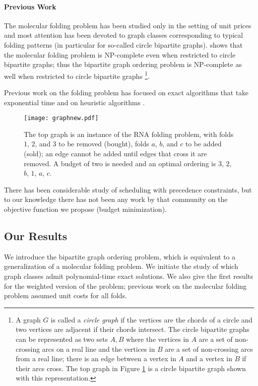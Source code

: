 \documentclass[letterpaper,11pt,abstracton]{scrartcl}
\begin{document}
\paragraph{Previous Work}
The molecular folding problem has been studied only in the
setting of unit prices and most attention has been devoted to graph classes corresponding to typical
folding patterns (in particular for so-called circle bipartite graphs).
\cite{MTSC09} shows that the molecular folding problem is NP-complete
even when restricted to circle bipartite graphs; thus the bipartite graph ordering
problem is NP-complete as well when restricted to circle bipartite graphs
\footnote{ A graph $G$ is called a \emph{circle graph} if the vertices
  are the chords of a circle and two vertices are adjacent if their
  chords intersect.  The circle bipartite graphs can be represented as two
  sets $A,B$ where the vertices in $A$ are a set of non-crossing arcs
  on a real line and the vertices in $B$ are a set of non-crossing
  arcs from a real line; there is an edge between a vertex in $A$ and
  a vertex in $B$ if their arcs cross.  The top graph in Figure
  \ref{fig:1} is a circle bipartite graph shown with this representation.}.

Previous work on the folding problem has focused on exact algorithms that
take exponential time and on heuristic algorithms \cite{FHMS01}.

\begin{figure}[htbp]
\begin{center}
\texttt{[image: graphnew.pdf]}
\caption{
\footnotesize{
  The top graph is an instance of the RNA folding problem, with folds $1$, $2$,
  and $3$ to be removed (bought), folds $a$, $b$, and $c$ to be added (sold); an edge cannot
  be added until edges that cross it are removed. A budget of two is needed and an optimal ordering is $3$, $2$, $b$, $1$, $a$, $c$.
}
}
\label{fig:1}
\end{center}
\end{figure}




There has been considerable study of scheduling with precedence constraints,
but to our knowledge there has not been any work by that community on the
objective function we propose (budget minimization).

\subsection{Our Results}

We introduce the bipartite graph ordering problem, which is equivalent to a
generalization of a molecular folding problem.  We initiate the study
of which graph classes admit polynomial-time exact solutions. We also
give the first results for the weighted version of the problem; previous
work on the molecular folding problem assumed unit costs for all folds.
\end{document}
